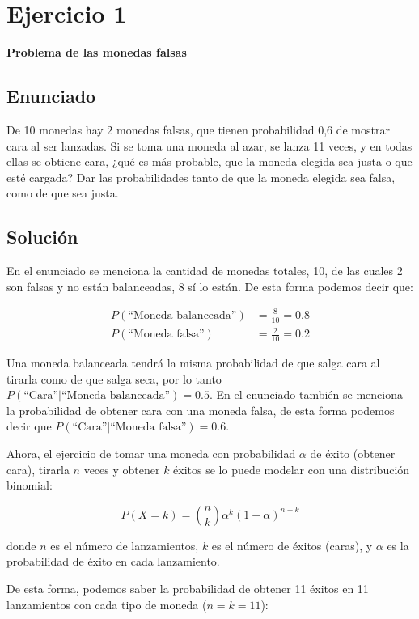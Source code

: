 \documentclass[11pt,a4paper]{article}
\begin{document}
\tableofcontents
\newpage

\section{Ejercicio 1}
\textbf{Problema de las monedas falsas}

\subsection{Enunciado}
De 10 monedas hay 2 monedas falsas, que tienen probabilidad 0,6 de mostrar cara al ser lanzadas. Si se toma una moneda al azar, se lanza 11 veces, y en todas ellas se obtiene cara, ¿qué es más probable, que la moneda elegida sea justa o que esté cargada? Dar las probabilidades tanto de que la moneda elegida sea falsa, como de que sea justa.

\subsection{Solución}

En el enunciado se menciona la cantidad de monedas totales, 10, de las cuales 2 son falsas y no están balanceadas, 8 sí lo están. De esta forma podemos decir que:

\begin{align*}
P(\text{``Moneda balanceada''}) &= \frac{8}{10} = 0.8 \\
P(\text{``Moneda falsa''}) &= \frac{2}{10} = 0.2
\end{align*}

Una moneda balanceada tendrá la misma probabilidad de que salga cara al tirarla como de que salga seca, por lo tanto $P(\text{``Cara''} | \text{``Moneda balanceada''}) = 0.5$. En el enunciado también se menciona la probabilidad de obtener cara con una moneda falsa, de esta forma podemos decir que $P(\text{``Cara''} | \text{``Moneda falsa''}) = 0.6$.

Ahora, el ejercicio de tomar una moneda con probabilidad $\alpha$ de éxito (obtener cara), tirarla $n$ veces y obtener $k$ éxitos se lo puede modelar con una distribución binomial:

\[
P(X = k) = \binom{n}{k} \alpha^k (1-\alpha)^{n-k}
\]

donde $n$ es el número de lanzamientos, $k$ es el número de éxitos (caras), y $\alpha$ es la probabilidad de éxito en cada lanzamiento.

De esta forma, podemos saber la probabilidad de obtener 11 éxitos en 11 lanzamientos con cada tipo de moneda ($n = k = 11$):
\end{document}
